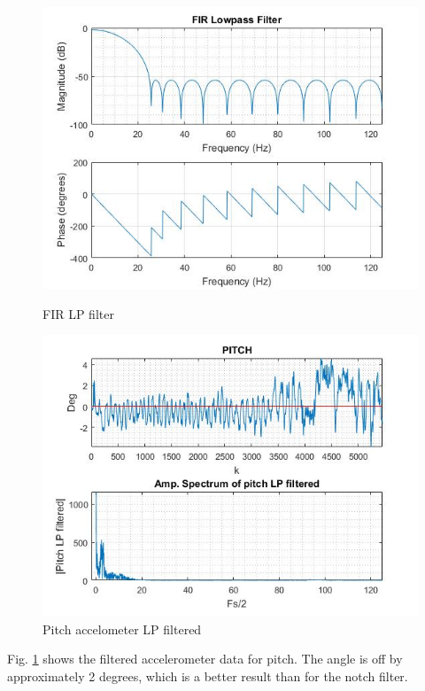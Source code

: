 \begin{figure}[H]
        \centering
            \begin{minipage}[b]{0.45\textwidth}
                \includegraphics[width = \textwidth, angle= 0]{VAPIQ-PICTURES/FIRlowPASSfilter.jpg}
                \caption{FIR LP filter}
                    \label{fig:FIRlpFilter}
            \end{minipage}
            \hfill
            \begin{minipage}[b]{0.45\textwidth}
                \includegraphics[width =\textwidth, angle =0]{VAPIQ-PICTURES/PitchAccelometerLPFiltered.jpg}
                \caption{Pitch accelometer LP filtered}
                \label{fig:pitchLPfiltered}
            \end{minipage}
\end{figure}
Fig. \ref{fig:pitchLPfiltered} shows the filtered accelerometer data for pitch. The angle is off by approximately 2 degrees, which is a better result than for the notch filter. \bigskip

